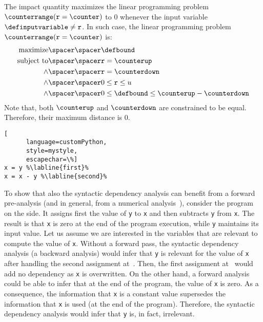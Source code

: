 \begin{example}
The impact quantity maximizes the linear programming problem $\counterrange(\texttt{r} = \counter)$ to $0$ whenever the input variable $\definputvariable \neq \texttt{r}$. In such case, the linear programming problem $\counterrange(\texttt{r} = \counter)$ is:
\begin{align}
  \text{maximize} \spacer\spacer& \defbound \\
  \text{subject to} \spacer\spacer
    & \texttt{r} = \counterup \\
    \land\spacer\spacer& \texttt{r} = \counterdown \\
    \land\spacer\spacer& 0\le \texttt{r} \le u \\
    \land\spacer\spacer& 0 \le \defbound \le \counterup - \counterdown
\end{align}
Note that, both $\counterup$ and $\counterdown$ are constrained to be equal. Therefore, their maximum distance is $0$.
\end{example}

\begin{marginlisting}[*1]
  \begin{lstlisting}[
      language=customPython,
      style=mystyle,
      escapechar=\%]
x = y %\labline{first}%
x = x - y %\labline{second}%
\end{lstlisting}
  \end{marginlisting}
\begin{example}
  To show that also the syntactic dependency analysis can benefit from a forward pre-analysis (and in general, from a numerical analysis~), consider the program on the side.
  It assigns first the value of \texttt{y} to \texttt{x} and then subtracts \texttt{y} from \texttt{x}.
  The result is that \texttt{x} is zero at the end of the program execution, while \texttt{y} maintains its input value.
%
  Let us assume we are interested in the variables that are relevant to compute the value of \texttt{x}.
  Without a forward pass, the syntactic dependency analysis (a backward analysis) would infer that \texttt{y} is relevant for the value of \texttt{x} after handling the second assignment at~. Then, the first assignment at~ would add no dependency as \texttt{x} is overwritten.
  On the other hand, a forward analysis could be able to infer that at the end of the program, the value of \texttt{x} is zero.
  As a consequence, the information that \texttt{x} is a constant value supersedes the information that \texttt{x} is used (at the end of the program).
  Therefore, the syntactic dependency analysis would infer that \texttt{y} is, in fact, irrelevant.
\end{example}


